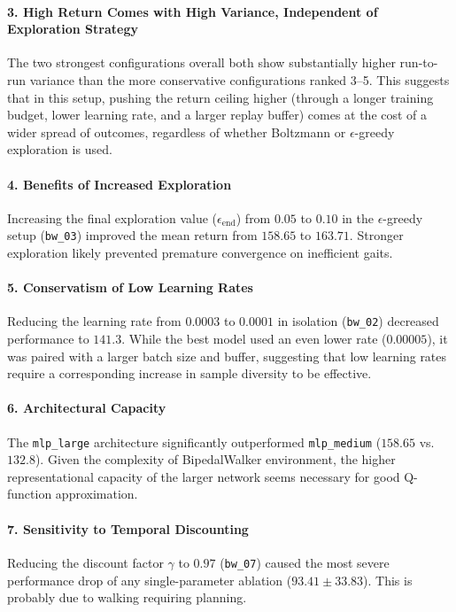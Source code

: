 \paragraph{3. High Return Comes with High Variance, Independent of Exploration Strategy}
The two strongest configurations overall both show substantially higher run-to-run variance than the more conservative configurations ranked 3--5. This suggests that in this setup, pushing the return ceiling higher (through a longer training budget, lower learning rate, and a larger replay buffer) comes at the cost of a wider spread of outcomes, regardless of whether Boltzmann or $\epsilon$-greedy exploration is used.

\paragraph{4. Benefits of Increased Exploration}
Increasing the final exploration value ($\epsilon_{\text{end}}$) from $0.05$ to $0.10$ in the $\epsilon$-greedy setup (\texttt{bw\_03}) improved the mean return from $158.65$ to $163.71$. Stronger exploration likely prevented premature convergence on inefficient gaits.

\paragraph{5. Conservatism of Low Learning Rates}
Reducing the learning rate from $0.0003$ to $0.0001$ in isolation (\texttt{bw\_02}) decreased performance to $141.3$. While the best model used an even lower rate ($0.00005$), it was paired with a larger batch size and buffer, suggesting that low learning rates require a corresponding increase in sample diversity to be effective.

\paragraph{6. Architectural Capacity}
The \texttt{mlp\_large} architecture significantly outperformed \texttt{mlp\_medium} ($158.65$ vs. $132.8$). Given the complexity of BipedalWalker environment, the higher representational capacity of the larger network seems necessary for good Q-function approximation.

\paragraph{7. Sensitivity to Temporal Discounting}
Reducing the discount factor $\gamma$ to $0.97$ (\texttt{bw\_07}) caused the most severe performance drop of any single-parameter ablation ($93.41 \pm 33.83$). This is probably due to walking requiring planning.

